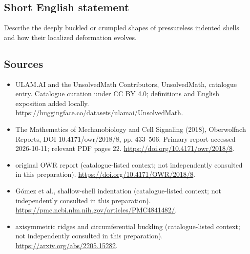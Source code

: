 \documentclass[11pt]{article}
\begin{document}
\subsection{Short English statement}
Describe the deeply buckled or crumpled shapes of pressureless indented shells and how their localized deformation evolves.
\subsection{Sources}
\begin{itemize}
\item[\hypertarget{source:statement:1}{S1}] ULAM.AI and the UnsolvedMath Contributors, UnsolvedMath, catalogue entry. Catalogue curation under CC BY 4.0; definitions and English exposition added locally.
\url{https://huggingface.co/datasets/ulamai/UnsolvedMath}.
\item[\hypertarget{source:statement:2}{S2}] The Mathematics of Mechanobiology and Cell Signaling (2018), Oberwolfach Reports, DOI 10.4171/owr/2018/8, pp. 433--506. Primary report accessed 2026-10-11; relevant PDF pages 22.
\url{https://doi.org/10.4171/owr/2018/8}.
\item[\hypertarget{source:statement:3}{S3}] original OWR report (catalogue-listed context; not independently consulted in this preparation).
\url{https://doi.org/10.4171/OWR/2018/8}.
\item[\hypertarget{source:statement:4}{S4}] Gómez et al., shallow-shell indentation (catalogue-listed context; not independently consulted in this preparation).
\url{https://pmc.ncbi.nlm.nih.gov/articles/PMC4841482/}.
\item[\hypertarget{source:statement:5}{S5}] axisymmetric ridges and circumferential buckling (catalogue-listed context; not independently consulted in this preparation).
\url{https://arxiv.org/abs/2205.15282}.
\end{itemize}
\label{end:statement}
\end{document}
